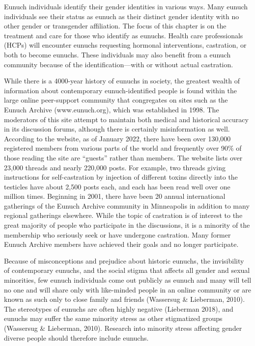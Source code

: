 \documentclass[
]{book}
\begin{document}
Eunuch individuals identify their gender identities in various ways. Many eunuch individuals
see their status as eunuch as their distinct gender
identity with no other gender or transgender
affiliation. The focus of this chapter is on the
treatment and care for those who identify as
eunuchs. Health care professionals (HCPs) will
encounter eunuchs requesting hormonal interventions, castration, or both to become eunuchs.
These individuals may also benefit from a eunuch
community because of the identification---with
or without actual castration.

While there is a 4000-year history of eunuchs
in society, the greatest wealth of information
about contemporary eunuch-identified people is
found within the large online peer-support community that congregates on sites such as the
Eunuch Archive (www.eunuch.org), which was
established in 1998. The moderators of this site
attempt to maintain both medical and historical
accuracy in its discussion forums, although there
is certainly misinformation as well. According to
the website, as of January 2022, there have been
over 130,000 registered members from various
parts of the world and frequently over 90\% of
those reading the site are ``guests'' rather than
members. The website lists over 23,000 threads
and nearly 220,000 posts. For example, two threads
giving instructions for self-castration by injection
of different toxins directly into the testicles have
about 2,500 posts each, and each has been read
well over one million times. Beginning in 2001,
there have been 20 annual international gatherings
of the Eunuch Archive community in Minneapolis
in addition to many regional gatherings elsewhere.
While the topic of castration is of interest to the
great majority of people who participate in the
discussions, it is a minority of the membership
who seriously seek or have undergone castration.
Many former Eunuch Archive members have
achieved their goals and no longer participate.

Because of misconceptions and prejudice about
historic eunuchs, the invisibility of contemporary
eunuchs, and the social stigma that affects all
gender and sexual minorities, few eunuch individuals come out publicly as eunuch and many
will tell no one and will share only with
like-minded people in an online community or
are known as such only to close family and
friends (Wassersug \& Lieberman, 2010). The stereotypes of eunuchs are often highly negative
(Lieberman 2018), and eunuchs may suffer the
same minority stress as other stigmatized groups
(Wassersug \& Lieberman, 2010). Research into
minority stress affecting gender diverse people
should therefore include eunuchs.
\end{document}
